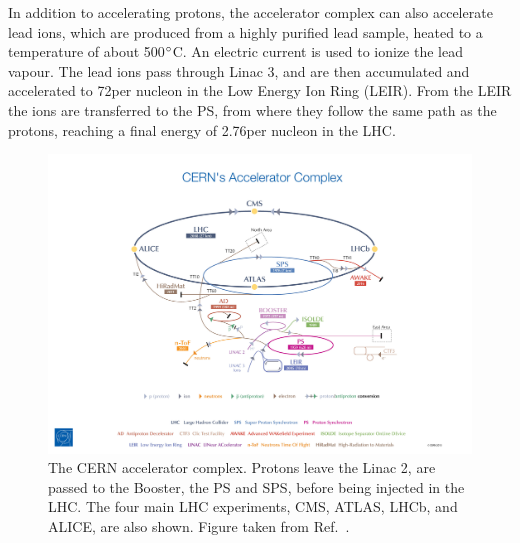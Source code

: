 In addition to accelerating protons, the accelerator complex can also accelerate lead ions, which
are produced from a highly purified lead sample, heated to a temperature of about 500$^\circ$C. An
electric current is used to ionize the lead vapour.
The lead ions pass through Linac 3, and are then accumulated and accelerated to 72\MeV per nucleon
in the Low Energy Ion Ring (LEIR). 
From the LEIR the ions are transferred to the PS, from where they follow the same path as the
protons, reaching a final energy of 2.76\TeV per nucleon in the LHC. 

\begin{figure}[t]
  \centering
  \includegraphics[width=\textwidth,clip=true,trim=10cm 0 13cm 9cm]
  {figures/lhc/cern_accelerator_complex_cds1621583}
  \caption{The CERN accelerator complex. Protons leave the Linac 2, are passed to the Booster, the
PS and SPS, before being injected in the LHC. The four main LHC experiments, CMS, ATLAS, LHCb, and
ALICE, are also shown. Figure taken from Ref.~\cite{lhc_complex}.
  \label{fig:lhc_complex}}
\end{figure}

